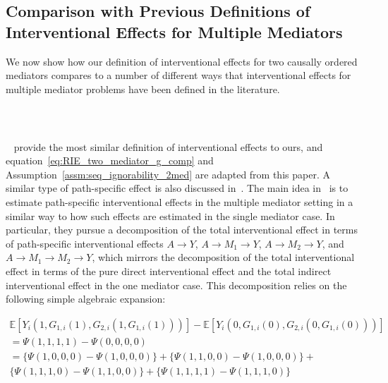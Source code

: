 \subsection{Comparison with Previous Definitions of Interventional Effects for Multiple Mediators}

We now show how our definition of interventional effects for two causally ordered mediators compares to 
a number of different ways that interventional effects for multiple mediator problems have been defined in 
the literature. 

\subsubsection{~\cite{linvanderweele2017}}

~\cite{linvanderweele2017} provide the most similar definition of interventional effects to ours, and 
equation~\ref{eq:RIE_two_mediator_g_comp} and Assumption~\ref{assm:seq_ignorability_2med} are adapted
from this paper. A similar type of path-specific effect is also discussed 
in~\citep{vanderweeletchetgentchetgen2017}. The main idea in~\cite{linvanderweele2017} is to estimate
path-specific interventional effects in the multiple mediator setting in a similar way to how 
such effects are estimated in the single mediator case. In particular, they pursue a decomposition
of the total interventional effect in terms of path-specific interventional effects 
$A \rightarrow Y$, $A \rightarrow M_{1} \rightarrow Y$, $A \rightarrow M_{2} \rightarrow Y$, 
and $A \rightarrow M_{1} \rightarrow M_{2} \rightarrow Y$, which mirrors the decomposition of 
the total interventional effect in terms of the pure direct interventional effect and the total 
indirect interventional effect in the one mediator case. This decomposition relies on the following
simple algebraic expansion: 

\begin{equation}
\begin{aligned}
	\mathbb{E}[Y_{i}(1,G_{1,i}(1),G_{2,i}(1,G_{1,i}(1)))] - 
	\mathbb{E}[Y_{i}(0,G_{1,i}(0),G_{2,i}(0,G_{1,i}(0)))]\\ 
	= \Psi(1,1,1,1) - \Psi(0,0,0,0)\\
	= \{\Psi(1,0,0,0) - \Psi(1,0,0,0)\} + \{\Psi(1,1,0,0) - \Psi(1,0,0,0)\} +\\ 
	\{\Psi(1,1,1,0) - \Psi(1,1,0,0)\} + \{\Psi(1,1,1,1) - \Psi(1,1,1,0)\}
\end{aligned}
\end{equation}

